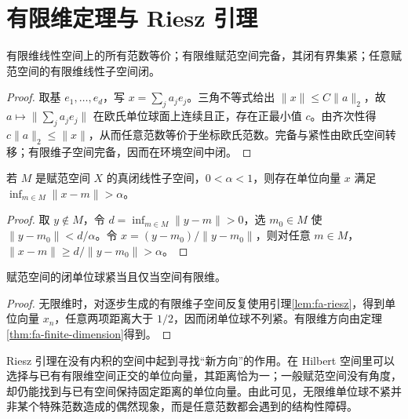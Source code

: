 \documentclass[UTF8,12pt,a4paper,fontset=fandol]{ctexbook}
\begin{document}
\section{有限维定理与 Riesz 引理}
\begin{theorem}\label{thm:fa-finite-dimension}
有限维线性空间上的所有范数等价；有限维赋范空间完备，其闭有界集紧；任意赋范空间的有限维线性子空间闭。
\end{theorem}
\begin{proof}
取基 $e_1,\ldots,e_d$，写 $x=\sum_ja_je_j$。三角不等式给出 $\|x\|\leq C\|a\|_2$，故 $a\mapsto\|\sum_ja_je_j\|$ 在欧氏单位球面上连续且正，存在正最小值 $c$。由齐次性得 $c\|a\|_2\leq\|x\|$，从而任意范数等价于坐标欧氏范数。完备与紧性由欧氏空间转移；有限维子空间完备，因而在环境空间中闭。
\end{proof}
\begin{lemma}[Riesz 引理]\label{lem:fa-riesz}
若 $M$ 是赋范空间 $X$ 的真闭线性子空间，$0<\alpha<1$，则存在单位向量 $x$ 满足 $\inf_{m\in M}\|x-m\|>\alpha$。
\end{lemma}
\begin{proof}
取 $y\notin M$，令 $d=\inf_{m\in M}\|y-m\|>0$，选 $m_0\in M$ 使 $\|y-m_0\|<d/\alpha$。令 $x=(y-m_0)/\|y-m_0\|$，则对任意 $m\in M$，$\|x-m\|\geq d/\|y-m_0\|>\alpha$。
\end{proof}
\begin{corollary}\label{cor:fa-unit-ball}
赋范空间的闭单位球紧当且仅当空间有限维。
\end{corollary}
\begin{proof}
无限维时，对逐步生成的有限维子空间反复使用引理\ref{lem:fa-riesz}，得到单位向量 $x_n$，任意两项距离大于 $1/2$，因而闭单位球不列紧。有限维方向由定理\ref{thm:fa-finite-dimension}得到。
\end{proof}

Riesz 引理在没有内积的空间中起到寻找“新方向”的作用。在 Hilbert 空间里可以选择与已有有限维空间正交的单位向量，其距离恰为一；一般赋范空间没有角度，却仍能找到与已有空间保持固定距离的单位向量。由此可见，无限维单位球不紧并非某个特殊范数造成的偶然现象，而是任意范数都会遇到的结构性障碍。
\end{document}
